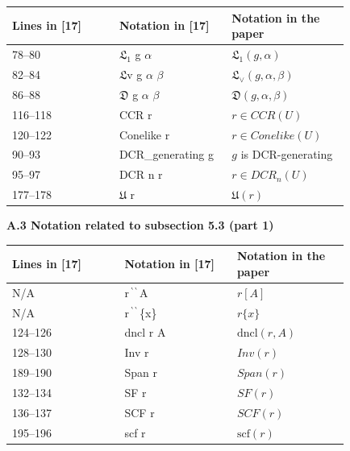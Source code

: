 \documentclass[10pt,a4paper]{amsart}
\begin{document}
\begin{longtable}{|p{0.27666666666666667\linewidth}|p{0.27666666666666667\linewidth}|p{0.27666666666666667\linewidth}|}\hline
Lines in [17] & Notation in [17] & Notation in the paper \\ \hline
78–80 & $\mathfrak{L}_{1}$ g $\alpha$ & $\mathfrak{L}_{1}(g,\alpha)$ \\ \hline
82–84 & $\mathfrak{L}$v g $\alpha$ $\beta$ & $\mathfrak{L}_{\vee}(g,\alpha,\beta)$ \\ \hline
86–88 & $\mathfrak{D}$ g $\alpha$ $\beta$ & $\mathfrak{D}(g,\alpha,\beta)$ \\ \hline
116–118 & CCR r & $r\in CCR(U)$ \\ \hline
120–122 & Conelike r & $r\in Conelike(U)$ \\ \hline
90–93 & DCR\_generating g & $g$ is DCR-generating \\ \hline
95–97 & DCR n r & $r\in DCR_{n}(U)$ \\ \hline
177–178 & $\mathfrak{U}$ r & $\mathfrak{U}(r)$ \\ \hline
\end{longtable}
 
 
 
 
\par\medskip\noindent\textbf{A.3 Notation related to subsection 5.3 (part 1)}\par
 
 
\begin{longtable}{|p{0.27666666666666667\linewidth}|p{0.27666666666666667\linewidth}|p{0.27666666666666667\linewidth}|}\hline
Lines in [17] & Notation in [17] & Notation in the paper \\ \hline
N/A & r$\,{}^{\backprime\,\backprime}\,$A & $r\left[A\right]$ \\ \hline
N/A & r$\,{}^{\backprime\,\backprime}\,$\{x\} & $r\{x\}$ \\ \hline
124–126 & dncl r A & $\mathrm{dncl}(r,A)$ \\ \hline
128–130 & Inv r & $Inv(r)$ \\ \hline
189–190 & Span r & $Span(r)$ \\ \hline
132–134 & SF r & $SF(r)$ \\ \hline
136–137 & SCF r & $SCF(r)$ \\ \hline
195–196 & scf r & $\mathrm{scf}(r)$ \\ \hline
\end{longtable}
 
\end{document}
